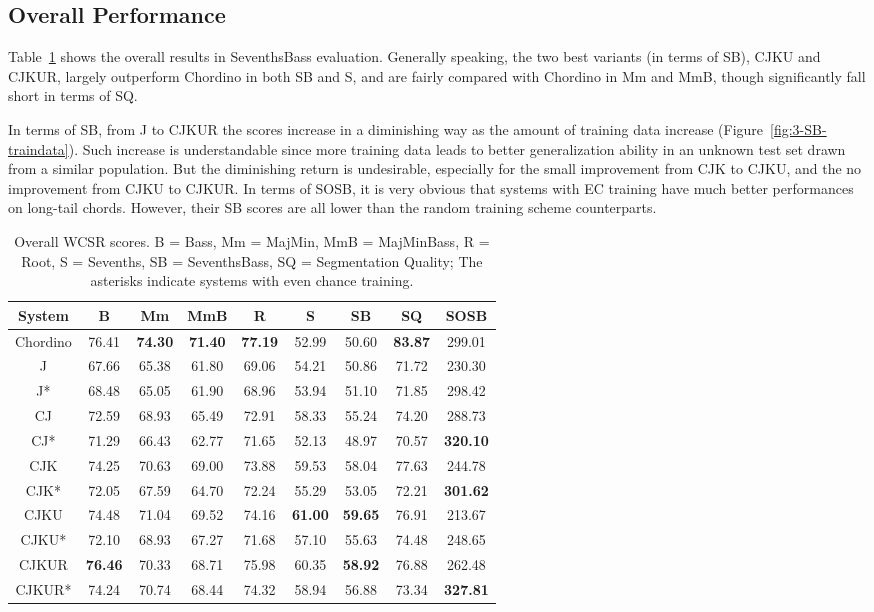 \subsection{Overall Performance}
Table~\ref{tab:4-overallres} shows the overall results in SeventhsBass evaluation. Generally speaking, the two best variants (in terms of SB), CJKU and CJKUR, largely outperform Chordino in both SB and S, and are fairly compared with Chordino in Mm and MmB, though significantly fall short in terms of SQ.

In terms of SB, from J to CJKUR the scores increase in a diminishing way as the amount of training data increase (Figure~\ref{fig:3-SB-traindata}). Such increase is understandable since more training data leads to better generalization ability in an unknown test set drawn from a similar population. But the diminishing return is undesirable, especially for the small improvement from CJK to CJKU, and the no improvement from CJKU to CJKUR. In terms of SOSB, it is very obvious that systems with EC training have much better performances on long-tail chords. However, their SB scores are all lower than the random training scheme counterparts.
\begin{table}[htb]
\caption{Overall WCSR scores. B = Bass, Mm = MajMin, MmB = MajMinBass, R = Root, S = Sevenths, SB = SeventhsBass, SQ = Segmentation Quality; The asterisks indicate systems with even chance training.}
\label{tab:4-overallres}
\centering
\scriptsize
\begin{tabular}{|c|c|c|c|c|c|c|c|c|}\hline
System & B & Mm & MmB & R & S & SB & SQ & SOSB \\ \hline
Chordino & 76.41 & \textbf{74.30} & \textbf{71.40} & \textbf{77.19} & 52.99 & 50.60 & \textbf{83.87} & 299.01\\ \hline
J& 67.66 & 65.38 & 61.80 & 69.06 & 54.21 & 50.86 & 71.72 & 230.30 \\ \hline
J* & 68.48 & 65.05 & 61.90 & 68.96 & 53.94 & 51.10 & 71.85 & 298.42 \\ \hline
CJ & 72.59 & 68.93 & 65.49 & 72.91 & 58.33 & 55.24 & 74.20 & 288.73 \\ \hline
CJ* & 71.29 & 66.43 & 62.77 & 71.65 & 52.13 & 48.97 & 70.57 & \textbf{320.10} \\ \hline
CJK & 74.25 & 70.63 & 69.00 & 73.88 & 59.53 & 58.04 & 77.63 & 244.78 \\ \hline
CJK* & 72.05 & 67.59 & 64.70 & 72.24 & 55.29 & 53.05 & 72.21& \textbf{301.62} \\ \hline
CJKU & 74.48 & 71.04 & 69.52 & 74.16 & \textbf{61.00} & \textbf{59.65} & 76.91 & 213.67 \\ \hline
CJKU* & 72.10 & 68.93 & 67.27 & 71.68 & 57.10 & 55.63 & 74.48 & 248.65 \\ \hline
CJKUR & \textbf{76.46} & 70.33 & 68.71 & 75.98 & 60.35 & \textbf{58.92} & 76.88 & 262.48 \\ \hline
CJKUR* & 74.24 & 70.74 & 68.44 & 74.32 & 58.94 & 56.88 & 73.34 & \textbf{327.81} \\ \hline
\end{tabular}
\end{table}

